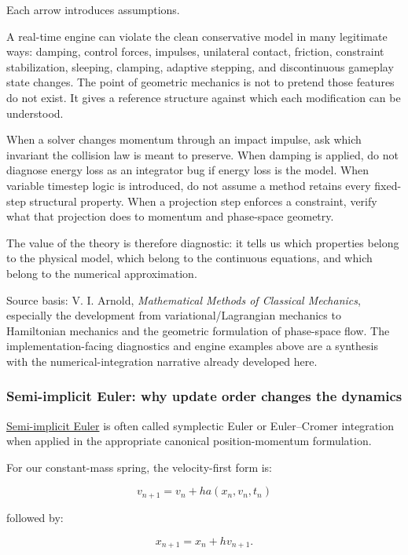 Each arrow introduces assumptions.

A real-time engine can violate the clean conservative model in many legitimate ways: damping, control forces, impulses, unilateral contact, friction, constraint stabilization, sleeping, clamping, adaptive stepping, and discontinuous gameplay state changes. The point of geometric mechanics is not to pretend those features do not exist. It gives a reference structure against which each modification can be understood.

When a solver changes momentum through an impact impulse, ask which invariant the collision law is meant to preserve. When damping is applied, do not diagnose energy loss as an integrator bug if energy loss is the model. When variable timestep logic is introduced, do not assume a method retains every fixed-step structural property. When a projection step enforces a constraint, verify what that projection does to momentum and phase-space geometry.

The value of the theory is therefore diagnostic: it tells us which properties belong to the physical model, which belong to the continuous equations, and which belong to the numerical approximation.

Source basis: V. I. Arnold, \emph{Mathematical Methods of Classical Mechanics}, especially the development from variational/Lagrangian mechanics to Hamiltonian mechanics and the geometric formulation of phase-space flow. The implementation-facing diagnostics and engine examples above are a synthesis with the numerical-integration narrative already developed here.

\subsubsection{Semi-implicit Euler: why update order changes the dynamics}\label{02-foundations-ii-ch025-semi-implicit-euler-why-update-order-changes-the-dynamics}

\hyperref[02-foundations-ii-ch025-odes-and-numerical-simulation]{Semi-implicit Euler} is often called symplectic Euler or Euler--Cromer integration when applied in the appropriate canonical position-momentum formulation.

For our constant-mass spring, the velocity-first form is:

\[
\boxed{ v_{n+1}=v_n+h a(x_n,v_n,t_n) }
\]

followed by:

\[
\boxed{ x_{n+1}=x_n+h v_{n+1} }.
\]

